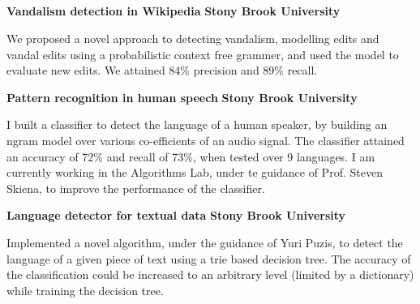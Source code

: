 \documentclass[a4paper,11pt,final]{article}
\newcommand{\resumetitle}[1]{%
  \subsection*{%
    \large\sc{#1}%
    \normalsize
  }%
  
}%
\newcommand{\projexp}[2]{%
  \vspace{12pt}
  \noindent\textbf{{#1}}
  \hfill
  \textbf{{#2}}
  \\\vspace{-12pt}
}
\newcommand{\resumedescheader}[1]{%
  \smallskip%
  \resumetitle{#1}
}%
\begin{document}

\resumedescheader{Projects} 

\vspace{-12pt}
\projexp{Vandalism detection in
  Wikipedia}{Stony Brook University}

\noindent We proposed a novel approach to
detecting vandalism, modelling edits and vandal edits using a
probabilistic context free grammer, and used the model to evaluate new
edits. We attained 84\% precision and 89\% recall.

\projexp{Pattern recognition in human speech}{Stony Brook University}

\noindent I built a classifier to detect the language of a human
speaker, by building an ngram model over various co-efficients of an
audio signal. The classifier attained an accuracy of 72\% and recall
of 73\%, when tested over 9 languages. I am currently working in the
Algorithms Lab, under te guidance of Prof. Steven Skiena, to improve
the performance of the classifier.

\projexp{Language detector for textual data}{Stony Brook University}

\noindent Implemented a novel algorithm, under the guidance of Yuri
Puzis, to detect the language of a given piece of text using a trie
based decision tree. The accuracy of the classification could be
increased to an arbitrary level (limited by a dictionary) while
training the decision tree.
\end{document}
